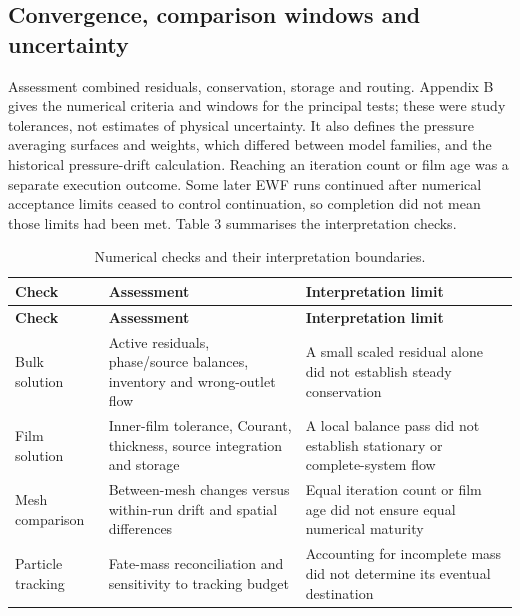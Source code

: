 \subsection{Convergence, comparison windows and uncertainty}

Assessment combined residuals, conservation, storage and routing. Appendix B gives the numerical criteria and windows for the principal tests; these were study tolerances, not estimates of physical uncertainty. It also defines the pressure averaging surfaces and weights, which differed between model families, and the historical pressure-drift calculation. Reaching an iteration count or film age was a separate execution outcome. Some later EWF runs continued after numerical acceptance limits ceased to control continuation, so completion did not mean those limits had been met. Table 3 summarises the interpretation checks.

\begin{longtable}{@{}>{\raggedright\arraybackslash}p{0.29000000\dimexpr\linewidth-4\tabcolsep\relax}>{\raggedright\arraybackslash}p{0.34000000\dimexpr\linewidth-4\tabcolsep\relax}>{\raggedright\arraybackslash}p{0.37000000\dimexpr\linewidth-4\tabcolsep\relax}@{}}
\caption{Numerical checks and their interpretation boundaries.}\label{tab:table-3}\\
\toprule
\textbf{Check} & \textbf{Assessment} & \textbf{Interpretation limit} \\
\midrule
\endfirsthead
\toprule
\textbf{Check} & \textbf{Assessment} & \textbf{Interpretation limit} \\
\midrule
\endhead
Bulk solution & Active residuals, phase/source balances, inventory and wrong-outlet flow & A small scaled residual alone did not establish steady conservation \\
Film solution & Inner-film tolerance, Courant, thickness, source integration and storage & A local balance pass did not establish stationary or complete-system flow \\
Mesh comparison & Between-mesh changes versus within-run drift and spatial differences & Equal iteration count or film age did not ensure equal numerical maturity \\
Particle tracking & Fate-mass reconciliation and sensitivity to tracking budget & Accounting for incomplete mass did not determine its eventual destination \\
\bottomrule
\end{longtable}

